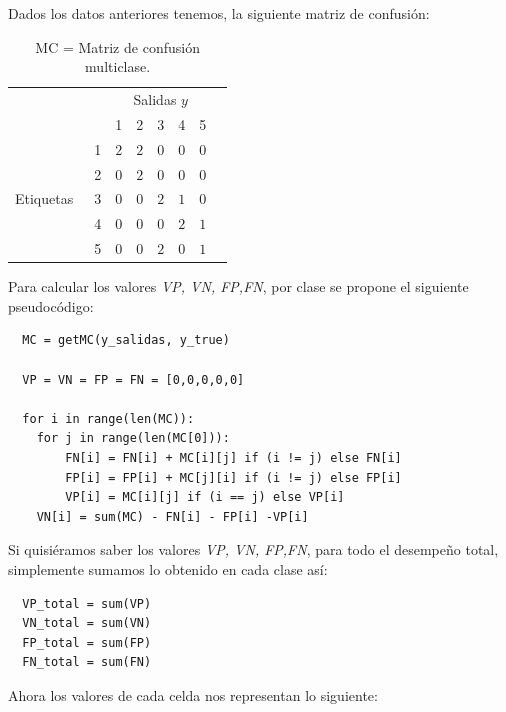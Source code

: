 \begin{description}
\begin{example}
Dados los datos anteriores tenemos, la siguiente matriz de confusión: 
 \begin{table}[H]
\begin{center}
\begin{tabular}{|c|c|c|c|c|c|c|c|}
\cline{3-7}
\multicolumn{2}{c|}{} & \multicolumn{5}{c|}{Salidas $y$} \\
\cline{3-7}
\multicolumn{2}{c|}{} & 1 & 2 & 3 & 4 & 5 \\
\hline
\multirow{5}{*}{\begin{sideways} Etiquetas~ \end{sideways}} & 1 & $2$ & $2$ & $0$ & $0$ & $0$ \\
\cline{2-7}
& 2 & $0$ & $2$  & $0$ & $0$ & $0$ \\
\cline{2-7}
& 3 & $0$ & $0$  & $2$ & $1$ & $0$ \\
\cline{2-7}
& 4 & $0$ & $0$  & $0$ & $2$ & $1$ \\
\cline{2-7}
& 5 & $0$ & $0$  & $2$ & $0$ & $1$ \\
\hline
\end{tabular}
\end{center}
\caption{MC = Matriz de confusión multiclase.}
\label{Table2}
\end{table}

\label{ej:muticlase}
\end{example}
 

 Para calcular los valores \emph{VP, VN, FP,FN}, por clase se propone el siguiente pseudocódigo:
 \begin{verbatim}
  MC = getMC(y_salidas, y_true)
  
  VP = VN = FP = FN = [0,0,0,0,0]

  for i in range(len(MC)):
    for j in range(len(MC[0])):
        FN[i] = FN[i] + MC[i][j] if (i != j) else FN[i]
        FP[i] = FP[i] + MC[j][i] if (i != j) else FP[i]
        VP[i] = MC[i][j] if (i == j) else VP[i]
    VN[i] = sum(MC) - FN[i] - FP[i] -VP[i]
 \end{verbatim}

 Si quisiéramos saber los valores \emph{VP, VN, FP,FN}, para todo el desempeño total, simplemente sumamos lo obtenido en cada clase así:

 \begin{verbatim}
  VP_total = sum(VP)
  VN_total = sum(VN)
  FP_total = sum(FP)
  FN_total = sum(FN)
 \end{verbatim}

    Ahora los valores de cada celda nos representan lo siguiente:
 

\end{description}

